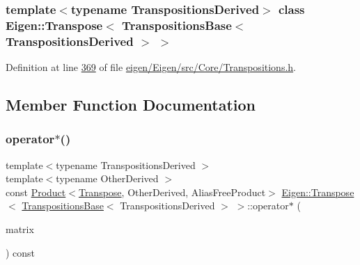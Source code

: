 \subsubsection*{template$<$typename Transpositions\+Derived$>$\newline
class Eigen\+::\+Transpose$<$ Transpositions\+Base$<$ Transpositions\+Derived $>$ $>$}



Definition at line \hyperlink{eigen_2_eigen_2src_2_core_2_transpositions_8h_source_l00369}{369} of file \hyperlink{eigen_2_eigen_2src_2_core_2_transpositions_8h_source}{eigen/\+Eigen/src/\+Core/\+Transpositions.\+h}.



\subsection{Member Function Documentation}
\mbox{\label{class_eigen_1_1_transpose_3_01_transpositions_base_3_01_transpositions_derived_01_4_01_4_aa221d105a46384dde9c221bc0d6c7c43}} 
\subsubsection{\texorpdfstring{operator$\ast$()}{operator*()}\hspace{0.1cm}{\footnotesize\ttfamily [1/2]}}
{\footnotesize\ttfamily template$<$typename Transpositions\+Derived $>$ \\
template$<$typename Other\+Derived $>$ \\
const \hyperlink{group___core___module_class_eigen_1_1_product}{Product}$<$\hyperlink{group___core___module_class_eigen_1_1_transpose}{Transpose}, Other\+Derived, Alias\+Free\+Product$>$ \hyperlink{group___core___module_class_eigen_1_1_transpose}{Eigen\+::\+Transpose}$<$ \hyperlink{class_eigen_1_1_transpositions_base}{Transpositions\+Base}$<$ Transpositions\+Derived $>$ $>$\+::operator$\ast$ (\begin{DoxyParamCaption}\item[{const \hyperlink{group___core___module_class_eigen_1_1_matrix_base}{Matrix\+Base}$<$ Other\+Derived $>$ \&}]{matrix }\end{DoxyParamCaption}) const\hspace{0.3cm}{\ttfamily [inline]}}

